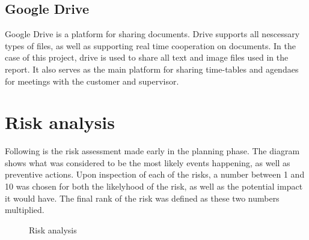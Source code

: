 \subsection{Google Drive}

Google Drive is a platform for sharing documents. Drive supports all nescessary types of files, as well as supporting real time cooperation on documents. In the case of this project, drive is used to share all text and image files used in the report. It also serves as the main platform for sharing time-tables and agendaes for meetings with the customer and supervisor.

\section{Risk analysis}

Following is the risk assessment made early in the planning phase. The diagram shows what was considered to be the most likely events happening, as well as preventive actions. Upon inspection of each of the risks, a number between 1 and 10 was chosen for both the likelyhood of the risk, as well as the potential impact it would have. The final rank of the risk was defined as these two numbers multiplied. 

\begin{center}
  \begin{figure}
    \caption{Risk analysis}
    \label{fig:risk_analysis}
  \end{figure}
\end{center}

